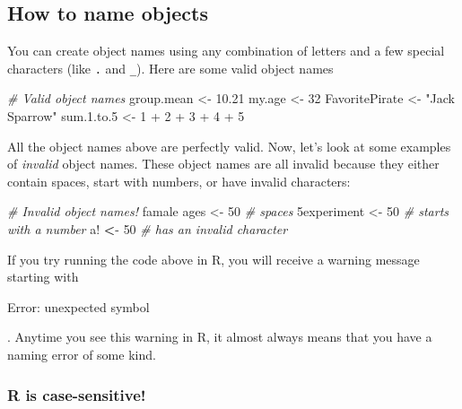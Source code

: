 \documentclass[]{book}
\newenvironment{Shaded}{\begin{snugshade}}{\end{snugshade}}
\newcommand{\DecValTok}[1]{\textcolor[rgb]{0.00,0.00,0.81}{{#1}}}
\newcommand{\FloatTok}[1]{\textcolor[rgb]{0.00,0.00,0.81}{{#1}}}
\newcommand{\StringTok}[1]{\textcolor[rgb]{0.31,0.60,0.02}{{#1}}}
\newcommand{\CommentTok}[1]{\textcolor[rgb]{0.56,0.35,0.01}{\textit{{#1}}}}
\newcommand{\ErrorTok}[1]{\textcolor[rgb]{0.64,0.00,0.00}{\textbf{{#1}}}}
\newcommand{\NormalTok}[1]{{#1}}
\theoremstyle{definition}
\theoremstyle{definition}
\theoremstyle{remark}
\begin{document}
\subsection{How to name objects}\label{how-to-name-objects}

You can create object names using any combination of letters and a few
special characters (like \texttt{.} and \texttt{\_}). Here are some
valid object names

\begin{Shaded}
\begin{Highlighting}[]
\CommentTok{# Valid object names}
\NormalTok{group.mean <-}\StringTok{ }\FloatTok{10.21}
\NormalTok{my.age <-}\StringTok{ }\DecValTok{32}
\NormalTok{FavoritePirate <-}\StringTok{ "Jack Sparrow"}
\NormalTok{sum}\FloatTok{.1}\NormalTok{.to}\FloatTok{.5} \NormalTok{<-}\StringTok{ }\DecValTok{1} \NormalTok{+}\StringTok{ }\DecValTok{2} \NormalTok{+}\StringTok{ }\DecValTok{3} \NormalTok{+}\StringTok{ }\DecValTok{4} \NormalTok{+}\StringTok{ }\DecValTok{5}
\end{Highlighting}
\end{Shaded}

All the object names above are perfectly valid. Now, let's look at some
examples of \emph{invalid} object names. These object names are all
invalid because they either contain spaces, start with numbers, or have
invalid characters:

\begin{Shaded}
\begin{Highlighting}[]
\CommentTok{# Invalid object names!}
\NormalTok{famale ages <-}\StringTok{ }\DecValTok{50} \CommentTok{# spaces}
\NormalTok{5experiment <-}\StringTok{ }\DecValTok{50} \CommentTok{# starts with a number}
\NormalTok{a!}\StringTok{ }\ErrorTok{<}\NormalTok{-}\StringTok{ }\DecValTok{50} \CommentTok{# has an invalid character}
\end{Highlighting}
\end{Shaded}

If you try running the code above in R, you will receive a warning
message starting with

Error: unexpected symbol

. Anytime you see this warning in R, it almost always means that you
have a naming error of some kind.

\subsubsection{R is case-sensitive!}\label{r-is-case-sensitive}
\end{document}
